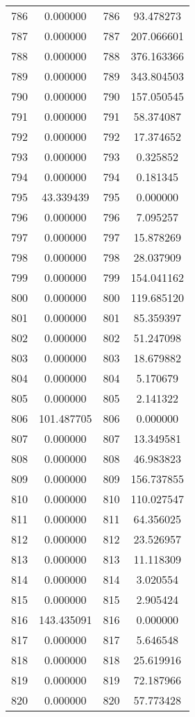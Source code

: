 \documentclass[12pt]{article}
\begin{document}
\begin{longtable}{@{}cccc@{}}
786 & 0.000000 & 786 & 93.478273 \\
787 & 0.000000 & 787 & 207.066601 \\
788 & 0.000000 & 788 & 376.163366 \\
789 & 0.000000 & 789 & 343.804503 \\
790 & 0.000000 & 790 & 157.050545 \\
791 & 0.000000 & 791 & 58.374087 \\
792 & 0.000000 & 792 & 17.374652 \\
793 & 0.000000 & 793 & 0.325852 \\
794 & 0.000000 & 794 & 0.181345 \\
795 & 43.339439 & 795 & 0.000000 \\
796 & 0.000000 & 796 & 7.095257 \\
797 & 0.000000 & 797 & 15.878269 \\
798 & 0.000000 & 798 & 28.037909 \\
799 & 0.000000 & 799 & 154.041162 \\
800 & 0.000000 & 800 & 119.685120 \\
801 & 0.000000 & 801 & 85.359397 \\
802 & 0.000000 & 802 & 51.247098 \\
803 & 0.000000 & 803 & 18.679882 \\
804 & 0.000000 & 804 & 5.170679 \\
805 & 0.000000 & 805 & 2.141322 \\
806 & 101.487705 & 806 & 0.000000 \\
807 & 0.000000 & 807 & 13.349581 \\
808 & 0.000000 & 808 & 46.983823 \\
809 & 0.000000 & 809 & 156.737855 \\
810 & 0.000000 & 810 & 110.027547 \\
811 & 0.000000 & 811 & 64.356025 \\
812 & 0.000000 & 812 & 23.526957 \\
813 & 0.000000 & 813 & 11.118309 \\
814 & 0.000000 & 814 & 3.020554 \\
815 & 0.000000 & 815 & 2.905424 \\
816 & 143.435091 & 816 & 0.000000 \\
817 & 0.000000 & 817 & 5.646548 \\
818 & 0.000000 & 818 & 25.619916 \\
819 & 0.000000 & 819 & 72.187966 \\
820 & 0.000000 & 820 & 57.773428 \\

\end{longtable}
\end{document}

